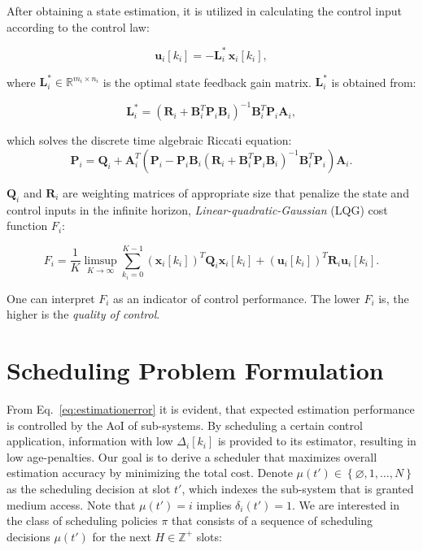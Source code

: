 After obtaining a state estimation, it is utilized in calculating the control
input according to the control law:

\begin{equation}
  \label{eq:controllaw}
  \boldsymbol{u}_i[k_i] = - \boldsymbol{L}_i^* \,\boldsymbol{\hat{x}}_i[k_i],
\end{equation}

where $\boldsymbol{L}_i^* \in \mathbb{R}^{m_i \times n_i}$ is the optimal state
feedback gain matrix. $\boldsymbol{L}^*_i$ is obtained from:

\begin{equation}
  \label{eq:optimalgain}
  \boldsymbol{L}_i^* = \left(\boldsymbol{R}_i + \boldsymbol{B}_i^T \boldsymbol{P}_i \boldsymbol{B}_i \right)^{-1} \boldsymbol{B}_i^T \boldsymbol{P}_i \boldsymbol{A}_i,
\end{equation}

which solves the discrete time algebraic Riccati equation:
\begin{equation}
  \label{eq:riccati}
  \boldsymbol{P}_i = \boldsymbol{Q}_{i} + \boldsymbol{A}_i^T \left(\boldsymbol{P}_i - \boldsymbol{P}_i \boldsymbol{B}_i ( \boldsymbol{R}_{i} + \boldsymbol{B}_i^T \boldsymbol{P}_i \boldsymbol{B}_i)^{- 1} \boldsymbol{B}_i^T \boldsymbol{P}_i \right) \boldsymbol{A}_i.
\end{equation}

$\boldsymbol{Q}_{i}$ and $\boldsymbol{R}_{i}$ are weighting matrices of
appropriate size that penalize the state and control inputs in the infinite
horizon, \textit{Linear-quadratic-Gaussian} (LQG) cost function $F_i$:

\begin{equation}
  F_i = \dfrac{1}{K} \limsup_{K \rightarrow \infty} \sum_{k_i=0}^{K-1} (\boldsymbol{x}_i[k_i])^T \boldsymbol{Q}_i \boldsymbol{x}_i[k_i] +  (\boldsymbol{u}_i[k_i])^T \boldsymbol{R}_i \boldsymbol{u}_i[k_i]. 
\end{equation}

One can interpret $F_i$ as an indicator of control performance. The lower $F_i$
is, the higher is the \textit{quality of control}.

\section{Scheduling Problem Formulation} \label{sec:problem} 

From Eq.~\eqref{eq:estimationerror} it is evident, that expected estimation
performance is controlled by the AoI of sub-systems. By scheduling a certain
control application, information with low $\Delta_i[k_i]$ is provided to its
estimator, resulting in low age-penalties. Our goal is to derive a scheduler
that maximizes overall estimation accuracy by minimizing the total cost. Denote
$\mu(t')\in\left\{\varnothing, 1, \dots,N \right\}$ as the scheduling decision
at slot $t'$, which indexes the sub-system that is granted medium access. Note
that $\mu(t')=i$ implies $\delta_i(t')=1$. We are interested in the class of
scheduling policies $\pi$ that consists of a sequence of scheduling decisions
$\mu(t')$ for the next $H \in \mathbb{Z}^+$ slots:

